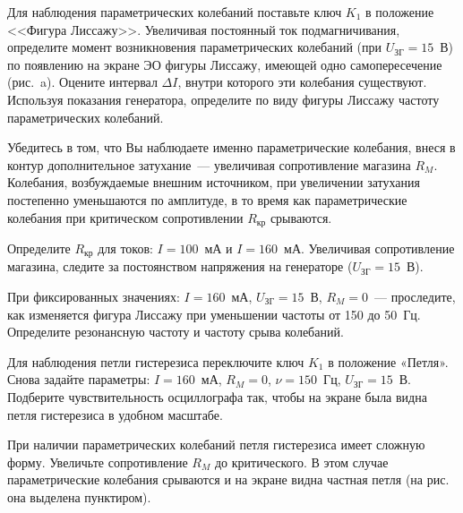 \begin{lab:task}
\item
\begin{minipage}[t]{0.6\textwidth}
Для наблюдения параметрических колебаний поставьте ключ $K_1$ в положение
<<Фигура Лиссажу>>. Увеличивая постоянный ток подмагничивания, определите момент
возникновения параметрических колебаний (при $U_\text{ЗГ} = 15$~В) по появлению
на экране ЭО фигуры Лиссажу, имеющей одно самопересечение (рис.~a). Оцените интервал $\Delta I$, внутри которого эти колебания
существуют. Используя показания генератора, определите по виду фигуры Лиссажу
частоту параметрических колебаний.
\end{minipage}
\hfil
\begin{minipage}[t]{0.3\textwidth}
\vspace*{1pt}
\centering
\end{minipage}

\item
Убедитесь в том, что Вы наблюдаете именно параметрические колебания, внеся в
контур дополнительное затухание~--- увеличивая сопротивление магазина $R_M$.
Колебания, возбуждаемые внешним источником, при увеличении затухания постепенно
уменьшаются по амплитуде, в то время как параметрические колебания при
критическом сопротивлении $R_\text{кр}$ срываются.

\item
Определите $R_\text{кр}$ для токов: $I = 100$~мА и $I = 160$~мА. Увеличивая
сопротивление магазина, следите за постоянством напряжения на генераторе
($U_\text{ЗГ} = 15$~В).

\item
При фиксированных значениях: $I = 160$~мА, $U_\text{ЗГ} = 15$~В, $R_M = 0$~---
проследите, как изменяется фигура Лиссажу при уменьшении частоты от 150 до
50~Гц. Определите резонансную частоту и частоту срыва колебаний.

\item
Для наблюдения петли гистерезиса переключите ключ $K_1$ в положение «Петля».
Снова задайте параметры: $I = 160$~мА, $R_M = 0$, $\nu = 150$~Гц, $U_\text{ЗГ} =
15$~В. Подберите чувствительность осциллографа так, чтобы на экране была видна
петля гистерезиса в удобном масштабе.

При наличии параметрических колебаний петля гистерезиса имеет сложную форму.
Увеличьте сопротивление $R_M$ до критического. В этом случае параметрические
колебания срываются и на экране видна частная петля (на рис.~ она выделена пунктиром).


\end{lab:task}
